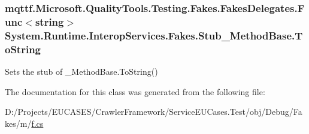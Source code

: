 \hypertarget{class_system_1_1_runtime_1_1_interop_services_1_1_fakes_1_1_stub___method_base_a09f12d7e9abdbfb4d08f345297b7a21c}{
\subsubsection[{To\-String}]{\setlength{\rightskip}{0pt plus 5cm}mqttf.\-Microsoft.\-Quality\-Tools.\-Testing.\-Fakes.\-Fakes\-Delegates.\-Func$<$string$>$ System.\-Runtime.\-Interop\-Services.\-Fakes.\-Stub\-\_\-\-Method\-Base.\-To\-String}}\label{class_system_1_1_runtime_1_1_interop_services_1_1_fakes_1_1_stub___method_base_a09f12d7e9abdbfb4d08f345297b7a21c}


Sets the stub of \-\_\-\-Method\-Base.\-To\-String()



The documentation for this class was generated from the following file\-:\begin{DoxyCompactItemize}
\item 
D\-:/\-Projects/\-E\-U\-C\-A\-S\-E\-S/\-Crawler\-Framework/\-Service\-E\-U\-Cases.\-Test/obj/\-Debug/\-Fakes/m/\hyperlink{m_2f_8cs}{f.\-cs}\end{DoxyCompactItemize}
